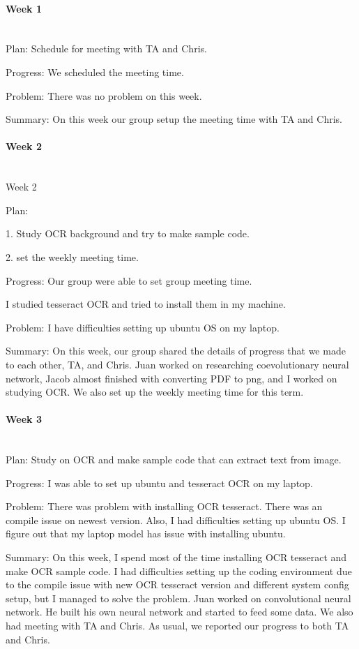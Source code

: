 \documentclass[article, onecolumn, draftclsnofoot,10pt, compsoc]{IEEEtran}
\begin{document}
\paragraph{Week 1}
\mbox{}\\
Plan: Schedule for meeting with TA and Chris.

Progress: We scheduled the meeting time.

Problem: There was no problem on this week.

Summary: On this week our group setup the meeting time with TA and Chris.

\paragraph{Week 2}
\mbox{}\\
Week 2

Plan:

1. Study OCR background and try to make sample code.

2. set the weekly meeting time.

Progress: Our group were able to set group meeting time.

I studied tesseract OCR and tried to install them in my machine. 

Problem: I have difficulties setting up ubuntu OS on my laptop. 

Summary: On this week, our group shared the details of progress that we made to each other, TA, and Chris. Juan worked on researching coevolutionary neural network, Jacob almost finished with converting PDF to png, and I worked on studying OCR. We also set up the weekly meeting time for this term.

\paragraph{Week 3}
\mbox{}\\
Plan: Study on OCR and make sample code that can extract text from image.
 
Progress: I was able to set up ubuntu and tesseract OCR on my laptop.
 
Problem: There was problem with installing OCR tesseract. There was an compile issue on newest version. Also, I had difficulties setting up ubuntu OS. I figure out that my laptop model has issue with installing ubuntu.

Summary: On this week, I spend most of the time installing OCR tesseract and make OCR sample code. I had difficulties setting up the coding environment due to the compile issue with new OCR tesseract version and different system config setup, but I managed to solve the problem. Juan worked on convolutional neural network. He built his own neural network and started to feed some data. We also had meeting with TA and Chris. As usual, we reported our progress to both TA and Chris.
\end{document}
